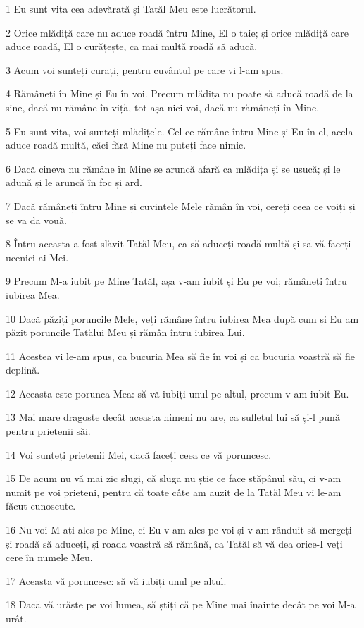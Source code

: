 \par 1 Eu sunt vița cea adevărată și Tatăl Meu este lucrătorul.
\par 2 Orice mlădiță care nu aduce roadă întru Mine, El o taie; și orice mlădiță care aduce roadă, El o curățește, ca mai multă roadă să aducă.
\par 3 Acum voi sunteți curați, pentru cuvântul pe care vi l-am spus.
\par 4 Rămâneți în Mine și Eu în voi. Precum mlădița nu poate să aducă roadă de la sine, dacă nu rămâne în viță, tot așa nici voi, dacă nu rămâneți în Mine.
\par 5 Eu sunt vița, voi sunteți mlădițele. Cel ce rămâne întru Mine și Eu în el, acela aduce roadă multă, căci fără Mine nu puteți face nimic.
\par 6 Dacă cineva nu rămâne în Mine se aruncă afară ca mlădița și se usucă; și le adună și le aruncă în foc și ard.
\par 7 Dacă rămâneți întru Mine și cuvintele Mele rămân în voi, cereți ceea ce voiți și se va da vouă.
\par 8 Întru aceasta a fost slăvit Tatăl Meu, ca să aduceți roadă multă și să vă faceți ucenici ai Mei.
\par 9 Precum M-a iubit pe Mine Tatăl, așa v-am iubit și Eu pe voi; rămâneți întru iubirea Mea.
\par 10 Dacă păziți poruncile Mele, veți rămâne întru iubirea Mea după cum și Eu am păzit poruncile Tatălui Meu și rămân întru iubirea Lui.
\par 11 Acestea vi le-am spus, ca bucuria Mea să fie în voi și ca bucuria voastră să fie deplină.
\par 12 Aceasta este porunca Mea: să vă iubiți unul pe altul, precum v-am iubit Eu.
\par 13 Mai mare dragoste decât aceasta nimeni nu are, ca sufletul lui să și-l pună pentru prietenii săi.
\par 14 Voi sunteți prietenii Mei, dacă faceți ceea ce vă poruncesc.
\par 15 De acum nu vă mai zic slugi, că sluga nu știe ce face stăpânul său, ci v-am numit pe voi prieteni, pentru că toate câte am auzit de la Tatăl Meu vi le-am făcut cunoscute.
\par 16 Nu voi M-ați ales pe Mine, ci Eu v-am ales pe voi și v-am rânduit să mergeți și roadă să aduceți, și roada voastră să rămână, ca Tatăl să vă dea orice-I veți cere în numele Meu.
\par 17 Aceasta vă poruncesc: să vă iubiți unul pe altul.
\par 18 Dacă vă urăște pe voi lumea, să știți că pe Mine mai înainte decât pe voi M-a urât.
